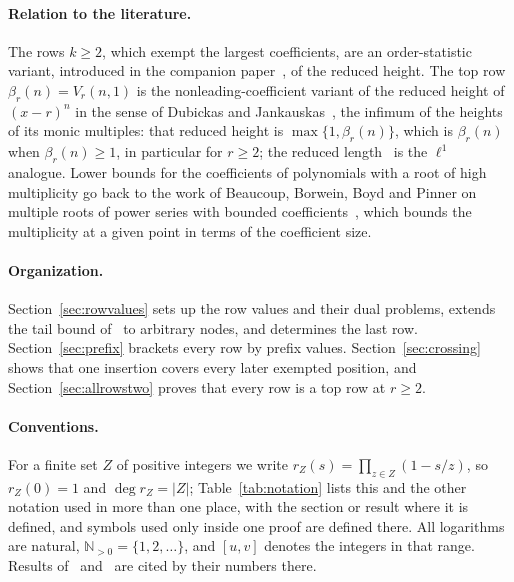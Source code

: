 \documentclass[11pt]{article}
\newcommand{\N}{\mathbb N}
\begin{document}
\paragraph{Relation to the literature.}
The rows $k\ge2$, which exempt the largest coefficients, are an
order-statistic variant, introduced in the companion
paper~\cite{coefficient-mass}, of the reduced height.  The top row
$\beta_r(n)=V_r(n,1)$ is the nonleading-coefficient variant of the reduced
height of $(x-r)^n$ in the sense of Dubickas and Jankauskas~\cite{dj}, the
infimum of the heights of its monic multiples: that reduced height is
$\max\{1,\beta_r(n)\}$, which is $\beta_r(n)$ when $\beta_r(n)\ge1$, in
particular for $r\ge2$; the reduced length~\cite{schinzel} is the $\ell^1$ analogue.
Lower bounds for the coefficients of polynomials with a root of high
multiplicity go back to the work of Beaucoup, Borwein, Boyd and Pinner on
multiple roots of power series with bounded
coefficients~\cite{bbbp-multiple}, which bounds the multiplicity at a
given point in terms of the coefficient size.

\paragraph{Organization.}
Section~\ref{sec:rowvalues} sets up the row values and their dual
problems, extends the tail bound of~\cite{coefficient-mass} to arbitrary
nodes, and determines the last row.  Section~\ref{sec:prefix} brackets
every row by prefix values.  Section~\ref{sec:crossing} shows that one
insertion covers every later exempted position,
and Section~\ref{sec:allrowstwo} proves that every row is a top row at
$r\ge2$.

\paragraph{Conventions.}
For a finite set $Z$ of positive integers we write
$r_Z(s)=\prod_{z\in Z}(1-s/z)$, so $r_Z(0)=1$ and $\deg r_Z=|Z|$;
Table~\ref{tab:notation} lists this and the other notation used in more
than one place, with the section or result where it is defined, and
symbols used only inside one proof are defined there.  All logarithms are
natural, $\N_{>0}=\{1,2,\ldots\}$, and $[u,v]$ denotes the integers in that
range.  Results of~\cite{coefficient-mass}
and~\cite{coefficient-mass-belowtwo} are cited by their numbers there.
\end{document}
